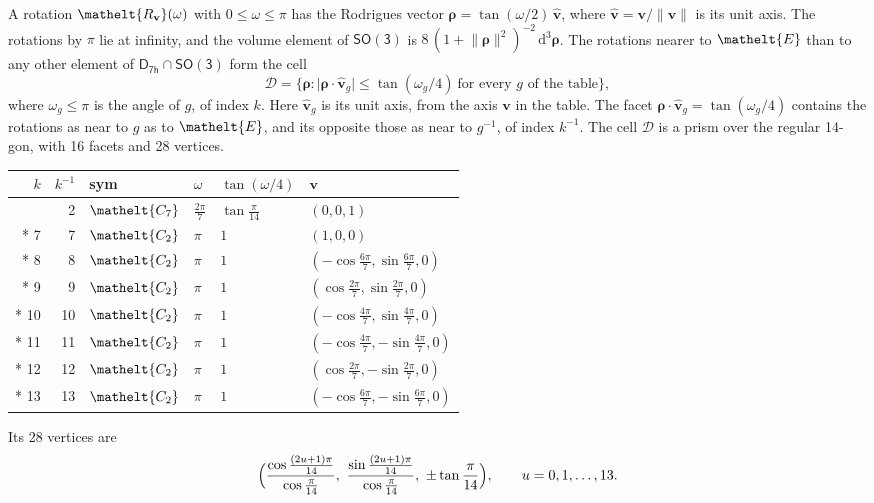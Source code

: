 \documentclass[10pt,a4paper]{article}
\numberwithin{equation}{section}
\newcommand{\eltfont}[1]{{\let\sigma\eltsigma\mathelt{#1}}}
\newcommand{\grp}[1]{\mathsf{#1}}
\newcommand{\cls}[1]{\eltfont{#1}}
\newcommand{\elt}[1]{\eltfont{#1}}
\newcommand{\dirvec}[3]{(#1, #2, #3)}
\newcommand{\unitaxis}{\hat{\mathbf{v}}}
\newcommand{\vv}{\mathbf{v}}
\newcommand{\diff}{\mathrm{d}}
\newcommand{\rodrigues}{\boldsymbol{\rho}}
\newcommand{\fcell}{\mathcal{D}}
\begin{document}
\leavevmode\label{n:vector.rodrigues}\label{n:vector.unitaxis}A rotation $\elt{R_{\vv}}(\omega)$ with $0 \le \omega \le \pi$ has the Rodrigues vector $\rodrigues = \tan(\omega/2)\,\unitaxis$, where $\unitaxis = \vv/\lVert\vv\rVert$ is its unit axis. The rotations by $\pi$ lie at infinity, and the volume element of \href{SO3.pdf}{$\grp{SO(3)}$} is $8\,(1 + \lVert\rodrigues\rVert^2)^{-2}\,\diff^3\rodrigues$.
\leavevmode\label{n:set.cell}The rotations nearer to $\elt{E}$ than to any other element of $\grp{D_{7h}} \cap \grp{SO(3)}$ form the cell
\begin{equation}\label{e:cell}\fcell = \bigl\{\rodrigues : \lvert\rodrigues\cdot\unitaxis_g\rvert \le \tan(\omega_g/4)\ \text{for every $g$ of the table}\bigr\},\end{equation}
where $\omega_g \le \pi$ is the angle of $g$, of index $k$. Here $\unitaxis_g$ is its unit axis, from the axis $\vv$ in the table. The facet $\rodrigues\cdot\unitaxis_g = \tan(\omega_g/4)$ contains the rotations as near to $g$ as to $\elt{E}$, and its opposite those as near to $g^{-1}$, of index $k^{-1}$. The cell $\fcell$ is a prism over the regular 14-gon, with 16 facets and 28 vertices.
{\small{\renewcommand{\arraystretch}{1.3}\begin{longtable}{@{}rrllll@{}}\toprule
$k$ & $k^{-1}$ & sym & $\omega$ & $\tan(\omega/4)$ & $\vv$\\\midrule\endhead
\bottomrule\endfoot\endlastfoot
1 & 2 & $\cls{C_{7}}$ & $\tfrac{2\pi}{7}$ & $\tan\tfrac{\pi}{14}$ & $\dirvec{0}{0}{1}$\\*
7 & 7 & $\cls{C_{2}}$ & $\pi$ & $1$ & $\dirvec{1}{0}{0}$\\*
8 & 8 & $\cls{C_{2}}$ & $\pi$ & $1$ & $\dirvec{-\cos\tfrac{6\pi}{7}}{\sin\tfrac{6\pi}{7}}{0}$\\*
9 & 9 & $\cls{C_{2}}$ & $\pi$ & $1$ & $\dirvec{\cos\tfrac{2\pi}{7}}{\sin\tfrac{2\pi}{7}}{0}$\\*
10 & 10 & $\cls{C_{2}}$ & $\pi$ & $1$ & $\dirvec{-\cos\tfrac{4\pi}{7}}{\sin\tfrac{4\pi}{7}}{0}$\\*
11 & 11 & $\cls{C_{2}}$ & $\pi$ & $1$ & $\dirvec{-\cos\tfrac{4\pi}{7}}{-\sin\tfrac{4\pi}{7}}{0}$\\*
12 & 12 & $\cls{C_{2}}$ & $\pi$ & $1$ & $\dirvec{\cos\tfrac{2\pi}{7}}{-\sin\tfrac{2\pi}{7}}{0}$\\*
13 & 13 & $\cls{C_{2}}$ & $\pi$ & $1$ & $\dirvec{-\cos\tfrac{6\pi}{7}}{-\sin\tfrac{6\pi}{7}}{0}$\\
\bottomrule\end{longtable}}}
\leavevmode\label{n:local.vertex.u}Its 28 vertices are
\begin{equation}\label{e:prism}\Bigl(\frac{\cos\frac{(2u+1)\pi}{14}}{\cos\frac{\pi}{14}},\ \frac{\sin\frac{(2u+1)\pi}{14}}{\cos\frac{\pi}{14}},\ \pm\tan\frac{\pi}{14}\Bigr),\qquad u = 0, 1, \dots, 13.\end{equation}
\end{document}
